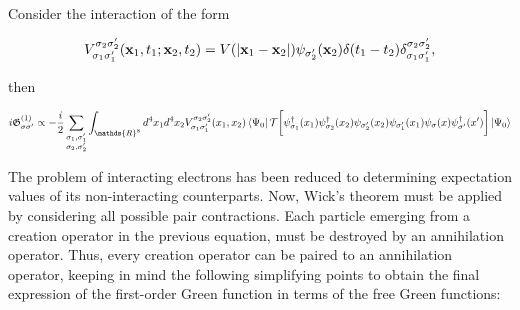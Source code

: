 Consider the interaction of the form 

$$
    V_{\sigma_1\sigma'_1}^{\sigma_2\sigma'_2}({{\bf x}}_1, t_1; {{\bf x}}_2, t_2) = V(|{{\bf x}}_1 - {{\bf x}}_2|) \psi_{\sigma_2'}({{\bf x}}_2) \delta(t_1-t_2) \delta_{\sigma_1\sigma'_1}^{\sigma_2\sigma'_2},
$$

then

\begin{equation}
    \begin{split}
        i \mathfrak{G}_{\sigma \sigma'}^{(1)} \propto - \frac{i}{2} \sum_{{\substack{\sigma_1, \sigma'_1 
         \\ \sigma_2, \sigma_2'}}}
        \int_{\mathds{R}^8} d^4x_1 d^4x_2 V_{\sigma_1\sigma'_1}^{\sigma_2\sigma'_2}(x_1, x_2) \bra{\Psi_0} \mathcal{T} \bigg[ \psi_{\sigma_1}^\dagger(x_1) \psi_{\sigma_2}^\dagger(x_2) \psi_{\sigma'_2}(x_2) \psi_{\sigma'_1}(x_1) \psi_{\sigma}(x) \psi^\dagger_{\sigma'}(x') \bigg] \ket{\Psi_0}
        \label{first_order_perturb_Green_function}
    \end{split}
\end{equation}

The problem of interacting electrons has been reduced to determining expectation values of its non-interacting counterparts. Now, Wick's theorem must be applied by considering all possible pair contractions. Each particle emerging from a creation operator in the previous equation, must be destroyed by an annihilation operator. Thus, every creation operator can be paired to an annihilation operator, keeping in mind the following simplifying points to obtain the final expression of the first-order Green function in terms of the free Green functions:

